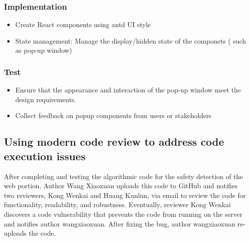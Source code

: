 \documentclass[journal]{IEEEtran}
\begin{document}
\subsubsection{Implementation}
\begin{itemize}
  \item Create React components using antd UI style
  \item State management: Manage the display/hidden state of the componets ( such as pop-up window)
\end{itemize}

\subsubsection{Test}
\begin{itemize}
  \item Ensure that the appearance and interaction of the pop-up window meet the design requirements.
  \item Collect feedback on popup components from users or stakeholders
\end{itemize}

\subsection{Using modern code review to address code execution issues}
After completing and testing the algorithmic code for the safety detection of the web portion, Author Wang Xiaoxuan uploads this code to GitHub and notifies two reviewers, Kong Wenkai and Huang Kunlun, via email to review the code for functionality, readability, and robustness. Eventually, reviewer Kong Wenkai discovers a code vulnerability that prevents the code from running on the server and notifies author wangxiaoxuan. After fixing the bug, author wangxiaoxuan re-uploads the code.
\end{document}

